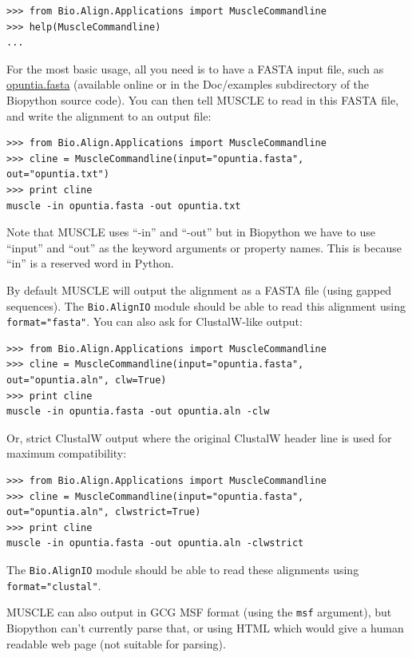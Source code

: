 \documentclass{report}
\begin{document}
\begin{verbatim}
>>> from Bio.Align.Applications import MuscleCommandline
>>> help(MuscleCommandline)
...
\end{verbatim}

For the most basic usage, all you need is to have a FASTA input file, such as
\href{http://biopython.org/DIST/docs/tutorial/examples/opuntia.fasta}{opuntia.fasta}
(available online or in the Doc/examples subdirectory of the Biopython source
code). You can then tell MUSCLE to read in this FASTA file, and write the
alignment to an output file:

\begin{verbatim}
>>> from Bio.Align.Applications import MuscleCommandline
>>> cline = MuscleCommandline(input="opuntia.fasta", out="opuntia.txt")
>>> print cline
muscle -in opuntia.fasta -out opuntia.txt
\end{verbatim}

Note that MUSCLE uses ``-in'' and ``-out'' but in Biopython we have to use
``input'' and ``out'' as the keyword arguments or property names. This is
because ``in'' is a reserved word in Python.

By default MUSCLE will output the alignment as a FASTA file (using gapped
sequences). The \verb|Bio.AlignIO| module should be able to read this
alignment using \texttt{format="fasta"}.
You can also ask for ClustalW-like output:

\begin{verbatim}
>>> from Bio.Align.Applications import MuscleCommandline
>>> cline = MuscleCommandline(input="opuntia.fasta", out="opuntia.aln", clw=True)
>>> print cline
muscle -in opuntia.fasta -out opuntia.aln -clw
\end{verbatim}

Or, strict ClustalW output where the original ClustalW header line is
used for maximum compatibility:

\begin{verbatim}
>>> from Bio.Align.Applications import MuscleCommandline
>>> cline = MuscleCommandline(input="opuntia.fasta", out="opuntia.aln", clwstrict=True)
>>> print cline
muscle -in opuntia.fasta -out opuntia.aln -clwstrict
\end{verbatim}

\noindent The \verb|Bio.AlignIO| module should be able to read these alignments
using \texttt{format="clustal"}.

MUSCLE can also output in GCG MSF format (using the \texttt{msf} argument), but
Biopython can't currently parse that, or using HTML which would give a human
readable web page (not suitable for parsing).
\end{document}
